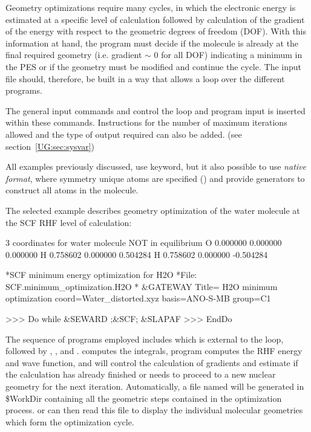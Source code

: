 Geometry optimizations require many cycles, in which the electronic energy is estimated at a specific
level of calculation followed by calculation of the gradient of the energy with respect to the geometric
degrees of freedom (DOF). With this information at hand, the program must decide if the molecule is 
already at the final required geometry (i.e. gradient $\sim$ 0 for all
DOF) indicating a minimum in the PES or if the geometry must be modified 
and continue the cycle. The input file should,
therefore, be built in a way that allows a loop over the different programs. 

The general input commands  and  control the loop 
and program input is inserted within these commands. Instructions for the number of maximum iterations allowed and the type of output required can also be added.
\ifmanual
(see section~\ref{UG:sec:sysvar})
\fi

All examples previously discussed, use  keyword, but it also possible
to use \textit{native format}, where symmetry unique atoms are specified () 
and provide generators to construct all atoms in the molecule.

The selected example describes geometry optimization of the water molecule at the SCF RHF level
of calculation:

\begin{inputlisting}
3
 coordinates for water molecule NOT in equilibrium 
O 0.000000  0.000000  0.000000 
H 0.758602  0.000000  0.504284 
H 0.758602  0.000000 -0.504284 
\end{inputlisting}


\begin{inputlisting}
*SCF minimum energy optimization for H2O
*File: SCF.minimum_optimization.H2O
*
&GATEWAY 
 Title= H2O minimum optimization
 coord=Water_distorted.xyz
 basis=ANO-S-MB
 group=C1

>>> Do while
 &SEWARD ;&SCF; &SLAPAF
>>> EndDo
\end{inputlisting}

The sequence of programs employed includes  which is external to the loop, followed by
, , and .  
computes the integrals,   program computes the RHF energy and wave 
function, and   will control the calculation of gradients and
estimate if the calculation has already finished or needs to proceed to a new
nuclear geometry for the next iteration. Automatically, a file named 
 will be generated in \$WorkDir containing all the 
geometric steps contained in the optimization process.  or  can 
then read this file to display the individual molecular geometries which form the optimization cycle.
 
